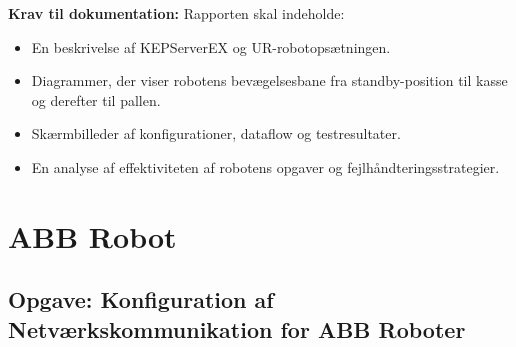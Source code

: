 \textbf{Krav til dokumentation:}
Rapporten skal indeholde:
\begin{itemize}
	\item En beskrivelse af KEPServerEX og UR-robotopsætningen.
	\item Diagrammer, der viser robotens bevægelsesbane fra standby-position til kasse og derefter til pallen.
	\item Skærmbilleder af konfigurationer, dataflow og testresultater.
	\item En analyse af effektiviteten af robotens opgaver og fejlhåndteringsstrategier.
\end{itemize}	

\chapter{ABB Robot}
\label{sec:abb_opgaver}

\section{Opgave: Konfiguration af Netværkskommunikation for ABB Roboter}
\label{subsec:network_communication_abb_robots}
